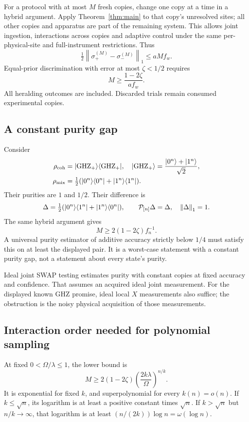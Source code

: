 \documentclass[11pt,a4paper]{article}
\newcommand{\norm}[1]{\left\lVert #1\right\rVert}
\newcommand{\ket}[1]{\lvert #1\rangle}\newcommand{\bra}[1]{\langle #1\rvert}
\begin{document}
For a protocol with at most $M$ fresh copies, change one copy at a time in a hybrid argument. Apply Theorem~\ref{thm:main} to that copy's unresolved sites; all other copies and apparatus are part of the remaining system. This allows joint ingestion, interactions across copies and adaptive control under the same per-physical-site and full-instrument restrictions. Thus
\begin{equation}
\tfrac12\norm{\sigma_+^{(M)}-\sigma_-^{(M)}}_1\le aM f_w.
\end{equation}
Equal-prior discrimination with error at most $\zeta<1/2$ requires
\begin{equation}
\boxed{M\ge\frac{1-2\zeta}{a f_w}.}
\label{eq:copies}
\end{equation}
All heralding outcomes are included. Discarded trials remain consumed experimental copies.

\subsection{A constant purity gap}
Consider
\begin{align}
\rho_{\rm coh}&=\ket{\mathrm{GHZ}_+}\bra{\mathrm{GHZ}_+},\quad
\ket{\mathrm{GHZ}_+}=\frac{\ket{0^n}+\ket{1^n}}{\sqrt2},\\
\rho_{\rm mix}&=\tfrac12(\ket{0^n}\bra{0^n}+\ket{1^n}\bra{1^n}).
\end{align}
Their purities are $1$ and $1/2$. Their difference is
\begin{equation}
\Delta=\tfrac12(\ket{0^n}\bra{1^n}+\ket{1^n}\bra{0^n}),\qquad
\calP_{[n]}\Delta=\Delta,\quad\norm\Delta_1=1.
\end{equation}
The same hybrid argument gives
\begin{equation}
\boxed{M\ge2(1-2\zeta)f_n^{-1}.}
\label{eq:purity}
\end{equation}
A universal purity estimator of additive accuracy strictly below $1/4$ must satisfy this on at least the displayed pair. It is a worst-case statement with a constant purity gap, not a statement about every state's purity.

Ideal joint SWAP testing estimates purity with constant copies at fixed accuracy and confidence. That assumes an acquired ideal joint measurement. For the displayed known GHZ promise, ideal local $X$ measurements also suffice; the obstruction is the noisy physical acquisition of those measurements.

\subsection{Interaction order needed for polynomial sampling}
At fixed $0<\Omega/\lambda\le1$, the lower bound is
\begin{equation}
M\ge2(1-2\zeta)\left(\frac{2k\lambda}{\Omega}\right)^{n/k}.
\end{equation}
It is exponential for fixed $k$, and superpolynomial for every $k(n)=o(n)$. If $k\le\sqrt n$, its logarithm is at least a positive constant times $\sqrt n$. If $k>\sqrt n$ but $n/k\to\infty$, that logarithm is at least $(n/(2k))\log n=\omega(\log n)$.
\end{document}
